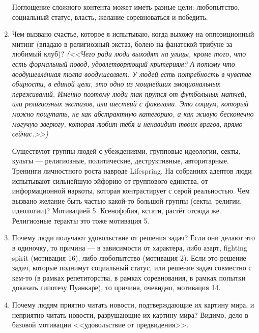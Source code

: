 \documentclass[11pt]{article}
\theoremstyle{remark}
\theoremstyle{definition}
\begin{document}
\begin{enumerate}
Поглощение сложного контента может иметь разные цели: любопытство, социальный статус, власть, желание соревноваться и победить.




\item Чем вызвано счастье, которое я испытываю, когда выхожу на оппозиционный митинг (впадаю в религиозный экстаз, болею на фанатской трибуне за любимый клуб)? \textit{(<<Чего ради люди выходят на улицы, кроме того, что есть формальный повод, удовлетворяющий критериям? А потому что воодушевлённая толпа воодушевляет. У людей есть потребность в чувстве общности, в единой цели, это одно из мощнейших эмоциональных переживаний. Именно поэтому люди так прутся от футбольных матчей, или религиозных экстазов, или шествий с факелами. Это социум, который можно пощупать, не как абстрактную категорию, а как живую бесконечно могучую зверюгу, которая любит тебя и ненавидит твоих врагов, прямо сейчас.>>)}

Существуют группы людей с убеждениями, групповые идеологии, секты, культы — религиозные, политические, деструктивные, авторитарные. Тренинги личностного роста навроде Lifespring. На собраниях адептов люди испытывают сильнейшую эйфорию от группового единства, от информационной наркоты, которая контрастирует с серой реальностью. Чем вызвано желание быть частью какой-то большой группы (секты, религии, идеологии)? Мотивацией 5. Ксенофобия, кстати, растёт отсюда же. Религиозные теракты это тоже мотивация 5.


\item Почему люди получают удовольствие от решения задач? Если они делают это в одиночку, то причина — в зависимости от характера, либо азарт, fighting spirit (мотивация 16), либо любопытство (мотивация 2). Если это решение задач, которые поднимут социальный статус, или решение задач совместно с кем-то (в рамках репетиторства, в рамках соревнования, в рамках попытки доказать гипотезу Пуанкаре), то причина, очевидно, мотивация 14.




\item Почему людям приятно читать новости, подтверждающие их картину мира, и неприятно читать новости, разрушающие их картину мира? Видимо, дело в базовой мотивации <<удовольствие от предвидения>>. 


\end{enumerate}
\end{document}
